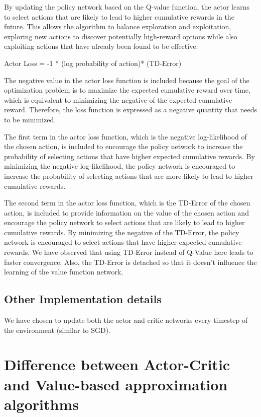 \documentclass{article} %
\begin{document}
By updating the policy network based on the Q-value function, the actor learns to select actions that are likely to lead to higher cumulative rewards in the future. This allows the algorithm to balance exploration and exploitation, exploring new actions to discover potentially high-reward options while also exploiting actions that have already been found to be effective.

Actor Loss = -1 * (log probability of action)* (TD-Error)

The negative value in the actor loss function is included because the goal of the optimization problem is to maximize the expected cumulative reward over time, which is equivalent to minimizing the negative of the expected cumulative reward. Therefore, the loss function is expressed as a negative quantity that needs to be minimized.

The first term in the actor loss function, which is the negative log-likelihood of the chosen action, is included to encourage the policy network to increase the probability of selecting actions that have higher expected cumulative rewards. By minimizing the negative log-likelihood, the policy network is encouraged to increase the probability of selecting actions that are more likely to lead to higher cumulative rewards.

The second term in the actor loss function, which is the TD-Error of the chosen action, is included to provide information on the value of the chosen action and encourage the policy network to select actions that are likely to lead to higher cumulative rewards. By minimizing the negative of the TD-Error, the policy network is encouraged to select actions that have higher expected cumulative rewards. We have observed that using TD-Error instead of Q-Value here leads to faster convergence. Also, the TD-Error is detached so that it doesn't influence the learning of the value function network.

\subsection{Other Implementation details}

We have chosen to update both the actor and critic networks every timestep of the environment (similar to SGD).

\section{Difference between Actor-Critic and Value-based approximation algorithms}
\end{document}
